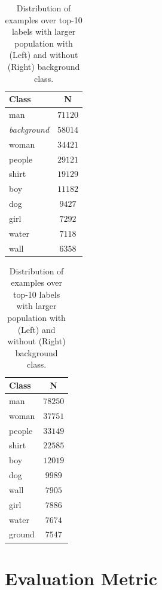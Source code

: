 \begin{table}
  \begin{subtable}{.5\linewidth}
    \centering
    \begin{tabular}{lc}
      Class                & N       \\\hline
      man                  & $71120$ \\
      \textit{background}  & $58014$ \\
      woman                & $34421$ \\
      people               & $29121$ \\
      shirt                & $19129$ \\
      boy                  & $11182$ \\
      dog                  & $9427$  \\
      girl                 & $7292$  \\
      water                & $7118$  \\
      wall                 & $6358$  \\
    \end{tabular}
  \end{subtable}%
  \begin{subtable}{.5\linewidth}
    \centering
    \begin{tabular}{lc}
      Class  & N       \\\hline
      man    & $78250$ \\
      woman  & $37751$ \\
      people & $33149$ \\
      shirt  & $22585$ \\
      boy    & $12019$ \\
      dog    & $9989$  \\
      wall   & $7905$  \\
      girl   & $7886$  \\
      water  & $7674$  \\
      ground & $7547$  \\
    \end{tabular}
  \end{subtable} 
  \caption{Distribution of examples over top-10 labels with larger population with (Left) and without (Right) background class.}
  \label{tab:flickr30k-label-data-top10}
\end{table}

\section{Evaluation Metric}
\label{sec:evaluation-metric}

